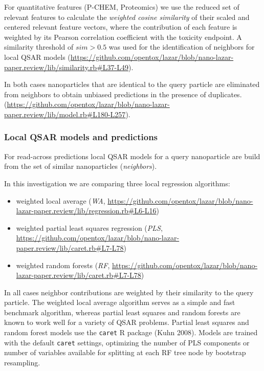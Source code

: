 \documentclass[utf8]{frontiersHLTH} %
\providecommand{\tightlist}{%
  \setlength{\itemsep}{0pt}\setlength{\parskip}{0pt}}
\begin{document}
For quantitative features (P-CHEM, Proteomics) we use the reduced set of
relevant features to calculate the \emph{weighted cosine similarity} of
their scaled and centered relevant feature vectors, where the
contribution of each feature is weighted by its Pearson correlation
coefficient with the toxicity endpoint. A similarity threshold of
\(sim > 0.5\) was used for the identification of neighbors for local
QSAR models
(\url{https://github.com/opentox/lazar/blob/nano-lazar-paper.review/lib/similarity.rb\#L37-L49}).

In both cases nanoparticles that are identical to the query particle are
eliminated from neighbors to obtain unbiased predictions in the presence
of duplicates.
(\url{https://github.com/opentox/lazar/blob/nano-lazar-paper.review/lib/model.rb\#L180-L257}).

\subsubsection{Local QSAR models and
predictions}\label{local-qsar-models-and-predictions}

For read-across predictions local QSAR models for a query nanoparticle
are build from the set of similar nanoparticles (\emph{neighbors}).

In this investigation we are comparing three local regression
algorithms:

\begin{itemize}
\tightlist
\item
  weighted local average (\emph{WA},
  \url{https://github.com/opentox/lazar/blob/nano-lazar-paper.review/lib/regression.rb\#L6-L16})
\item
  weighted partial least squares regression (\emph{PLS},
  \url{https://github.com/opentox/lazar/blob/nano-lazar-paper.review/lib/caret.rb\#L7-L78})
\item
  weighted random forests (\emph{RF},
  \url{https://github.com/opentox/lazar/blob/nano-lazar-paper.review/lib/caret.rb\#L7-L78})
\end{itemize}

In all cases neighbor contributions are weighted by their similarity to
the query particle. The weighted local average algorithm serves as a
simple and fast benchmark algorithm, whereas partial least squares and
random forests are known to work well for a variety of QSAR problems.
Partial least squares and random forest models use the \texttt{caret} R
package (Kuhn 2008). Models are trained with the default \texttt{caret}
settings, optimizing the number of PLS components or number of variables
available for splitting at each RF tree node by bootstrap resampling.
\end{document}
